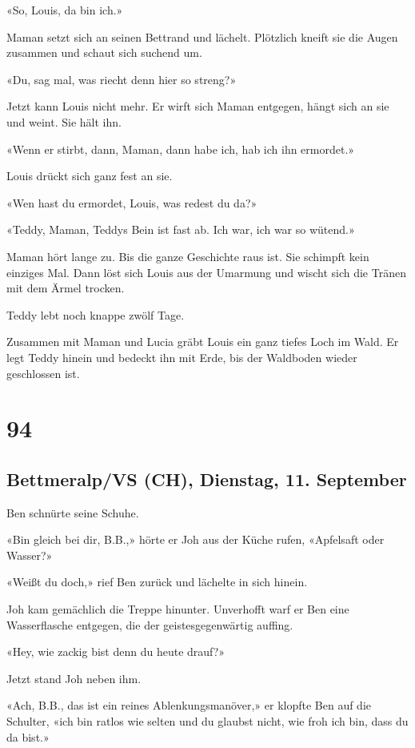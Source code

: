 «So, Louis, da bin ich.»

Maman setzt sich an seinen Bettrand und lächelt. Plötzlich kneift sie
die Augen zusammen und schaut sich suchend um.

«Du, sag mal, was riecht denn hier so streng?»

Jetzt kann Louis nicht mehr. Er wirft sich Maman entgegen, hängt sich an
sie und weint. Sie hält ihn.

«Wenn er stirbt, dann, Maman, dann habe ich, hab ich ihn ermordet.»

Louis drückt sich ganz fest an sie.

«Wen hast du ermordet, Louis, was redest du da?»

«Teddy, Maman, Teddys Bein ist fast ab. Ich war, ich war so wütend.»

Maman hört lange zu. Bis die ganze Geschichte raus ist. Sie schimpft
kein einziges Mal. Dann löst sich Louis aus der Umarmung und wischt sich
die Tränen mit dem Ärmel trocken.

Teddy lebt noch knappe zwölf Tage.

Zusammen mit Maman und Lucia gräbt Louis ein ganz tiefes Loch im Wald.
Er legt Teddy hinein und bedeckt ihn mit Erde, bis der Waldboden wieder
geschlossen ist.

\chapter{94}\label{section-94}

\section{Bettmeralp/VS (CH), Dienstag, 11.
September}\label{bettmeralpvs-ch-dienstag-11.-september}

Ben schnürte seine Schuhe.

«Bin gleich bei dir, B.B.,» hörte er Joh aus der Küche rufen, «Apfelsaft
oder Wasser?»

«Weißt du doch,» rief Ben zurück und lächelte in sich hinein.

Joh kam gemächlich die Treppe hinunter. Unverhofft warf er Ben eine
Wasserflasche entgegen, die der geistesgegenwärtig auffing.

«Hey, wie zackig bist denn du heute drauf?»

Jetzt stand Joh neben ihm.

«Ach, B.B., das ist ein reines Ablenkungsmanöver,» er klopfte Ben auf
die Schulter, «ich bin ratlos wie selten und du glaubst nicht, wie froh
ich bin, dass du da bist.»

